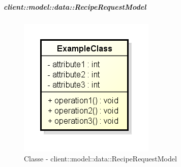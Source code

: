 
		\subparagraph{client::model::data::RecipeRequestModel} %
		\label{subp:client_model_data_reciperequestmodel}
			\begin{figure}[htbp]
				\centering
				\centerline{\includegraphics[scale=0.7]{./images/client/classes/example_class.png}}
				\caption{Classe - client::model::data::RecipeRequestModel}
			\end{figure}

